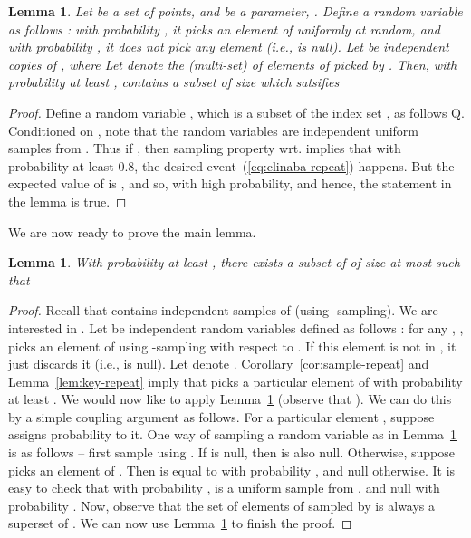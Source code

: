 \documentclass[a4paper]{article}
\newtheorem{lemma}[theorem]{Lemma}
\begin{document}
\begin{lemma}
\label{lem:clinaba-repeat}
Let  be a set of  points, and  be a parameter, . Define a random variable  as follows :
with probability , it picks an element of  uniformly at random, and with  probability , it does not
pick any element (i.e., is null). Let  be  independent copies of , where 
Let  denote the (multi-set) of elements of  picked by . Then, with probability at least ,
 contains a subset  of size  which satsifies

\end{lemma}
\begin{proof}
 Define a random variable , which is a subset of the index set , as follows
Q. Conditioned on , note that the random variables  are independent uniform samples from . 
Thus if , then sampling property wrt.  implies that with 
probability at least 0.8, the desired event~(\ref{eq:clinaba-repeat}) happens. 
But the expected value of  is , and so,  with high probability, and hence, the statement in the lemma is true.
\end{proof}

\noindent
We are now ready to prove the main lemma.
\begin{lemma}
\label{lem:final-repeat}
With probability at least , there exists a subset  of  of size at most  such that

\end{lemma}
\begin{proof}
Recall that  contains  independent samples of  (using -sampling). We are interested in .
Let  be   independent random variables defined as follows : for any , ,  picks an element of  using -sampling with respect to . 
If this element is not in , it just discards it (i.e.,  is null). 
Let  denote . Corollary~\ref{cor:sample-repeat} and Lemma~\ref{lem:key-repeat} imply that  picks a particular element of  with probability at least . 
We would now like to apply Lemma~\ref{lem:clinaba-repeat} (observe that ). 
We can do this by a simple coupling argument as follows.
For a particular element , suppose  assigns probability  to it.
One way of sampling a random variable  as in Lemma~\ref{lem:clinaba-repeat} is as follows --  first sample using . If  is null, then  is also null. Otherwise, suppose  picks an element  of . 
Then  is equal to  with probability , and null otherwise. 
It is easy to check that with probability ,  is a uniform sample from , and null with probability . 
Now, observe that the set of elements of  sampled by  is always a superset of . 
We can now use Lemma~\ref{lem:clinaba-repeat} to finish the proof.
\end{proof}
\end{document}
